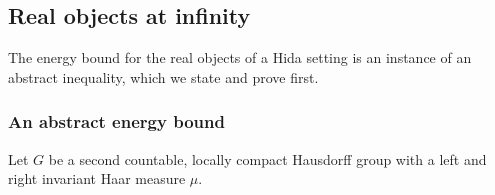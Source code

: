 \subsection{Real objects at infinity}\label{sec:pf:sh-local:real}

The energy bound for the real objects of a Hida setting is an instance of an abstract inequality, which we state
and prove first.

\subsubsection{An abstract energy bound}
Let $G$ be a second countable, locally compact Hausdorff group with a left and right invariant Haar measure $\mu$.

